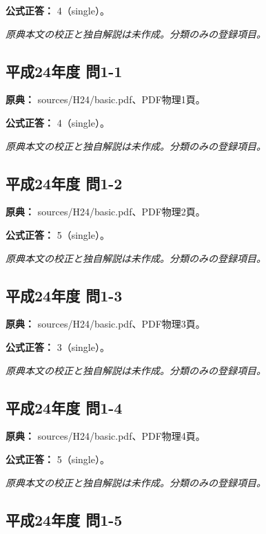 \textbf{公式正答：} 4（single）。

\par\textit{原典本文の校正と独自解説は未作成。分類のみの登録項目。}

\subsection{平成24年度 問1-1}
\label{q:h24-reg-basic-1-1}

\noindent\textbf{原典：} sources/H24/basic.pdf、PDF物理1頁。

\textbf{公式正答：} 4（single）。

\par\textit{原典本文の校正と独自解説は未作成。分類のみの登録項目。}

\subsection{平成24年度 問1-2}
\label{q:h24-reg-basic-1-2}

\noindent\textbf{原典：} sources/H24/basic.pdf、PDF物理2頁。

\textbf{公式正答：} 5（single）。

\par\textit{原典本文の校正と独自解説は未作成。分類のみの登録項目。}

\subsection{平成24年度 問1-3}
\label{q:h24-reg-basic-1-3}

\noindent\textbf{原典：} sources/H24/basic.pdf、PDF物理3頁。

\textbf{公式正答：} 3（single）。

\par\textit{原典本文の校正と独自解説は未作成。分類のみの登録項目。}

\subsection{平成24年度 問1-4}
\label{q:h24-reg-basic-1-4}

\noindent\textbf{原典：} sources/H24/basic.pdf、PDF物理4頁。

\textbf{公式正答：} 5（single）。

\par\textit{原典本文の校正と独自解説は未作成。分類のみの登録項目。}

\subsection{平成24年度 問1-5}
\label{q:h24-reg-basic-1-5}

